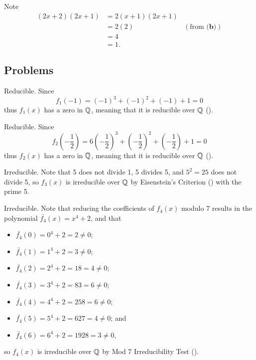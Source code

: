 \begin{questions}
\begin{partquestions}{\alph*}
        \item Note
        \begin{align*}
            (2x+2)(2x+1) &= 2(x+1)(2x+1)\\
            &= 2(2) & (\text{from }\textbf{(b)})\\
            &= 4\\
            &= 1.
        \end{align*}
    \end{partquestions}
\end{questions}

\subsection*{Problems}
\begin{questions}
    \item \begin{partquestions}{\alph*}
        \item Reducible. Since
        \[
            f_1(-1) = (-1)^3 + (-1)^2 + (-1) + 1 = 0
        \]
        thus $f_1(x)$ has a zero in $\mathbb{Q}$, meaning that it is reducible over $\mathbb{Q}$ ().

        \item Reducible. Since
        \[
            f_2\left(-\frac12\right) = 6\left(-\frac12\right)^3 + \left(-\frac12\right)^2 + \left(-\frac12\right) + 1 = 0
        \]
        thus $f_2(x)$ has a zero in $\mathbb{Q}$, meaning that it is reducible over $\mathbb{Q}$ ().

        \item Irreducible. Note that 5 does not divide 1, 5 divides 5, and $5^2 = 25$ does not divide 5, so $f_3(x)$ is irreducible over $\mathbb{Q}$ by Eisenstein's Criterion () with the prime 5.

        \item Irreducible. Note that reducing the coefficients of $f_4(x)$ modulo 7 results in the polynomial $\bar{f_4}(x) = x^4 + 2$, and that
        \begin{itemize}
            \item $\bar{f_4}(0) = 0^4 + 2 = 2 \neq 0$;
            \item $\bar{f_4}(1) = 1^4 + 2 = 3 \neq 0$;
            \item $\bar{f_4}(2) = 2^4 + 2 = 18 = 4 \neq 0$;
            \item $\bar{f_4}(3) = 3^4 + 2 = 83 = 6 \neq 0$;
            \item $\bar{f_4}(4) = 4^4 + 2 = 258 = 6 \neq 0$;
            \item $\bar{f_4}(5) = 5^4 + 2 = 627 = 4 \neq 0$; and
            \item $\bar{f_4}(6) = 6^4 + 2 = 1928 = 3 \neq 0$,
        \end{itemize}
        so $f_4(x)$ is irreducible over $\mathbb{Q}$ by Mod 7 Irreducibility Test ().


\end{partquestions}
\end{questions}
